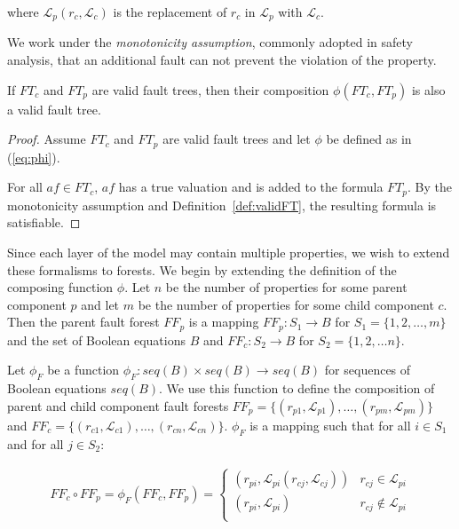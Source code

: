 where $\mathcal{L}_p(r_c, \mathcal{L}_c)$ is the replacement of $r_c$ in $\mathcal{L}_p$ with $\mathcal{L}_c$.

We work under the {\em monotonicity assumption}, commonly adopted in safety analysis, that an additional fault can not prevent the violation of the property. 

\begin{lemma} If $\mathit{FT}_c$ and $\mathit{FT}_p$ are valid fault trees, then their composition $\phi(\mathit{FT}_c, \mathit{FT}_p)$ is also a valid fault tree. 
\begin{proof}
Assume $\mathit{FT}_c$ and $\mathit{FT}_p$ are valid fault trees and let $\phi$ be defined as in (\ref{eq:phi}).  

For all $\mathit{af} \in \mathit{FT}_c$, $\mathit{af}$ has a true valuation and is added to the formula $\mathit{FT}_p$. By the monotonicity assumption and Definition~\ref{def:validFT}, the resulting formula is satisfiable. 
\end{proof}
\label{lemma:validTree}
\end{lemma}

Since each layer of the model may contain multiple properties, we wish to extend these formalisms to forests. We begin by extending the definition of the composing function $\phi$. Let $n$ be the number of properties for some parent component $p$ and let $m$ be the number of properties for some child component $c$. Then the parent fault forest $\mathit{FF}_p$ is a mapping $\mathit{FF}_p : S_1 \rightarrow B$ for $S_1 = \{1,2,\dots,m\}$ and the set of Boolean equations $B$ and $\mathit{FF}_c: S_2 \rightarrow B$ for $S_2 = \{1,2,\dots n\}$. 

Let $\phi_F$ be a function $\phi _F: \mathit{seq(B)} \times \mathit{seq(B)} \rightarrow \mathit{seq(B)}$ for sequences of Boolean equations $\mathit{seq(B)}$. We use this function to define the composition of parent and child component fault forests $\mathit{FF}_p = \{(r_{p1},\mathcal{L}_{p1}), \dots, (r_ {pm}, \mathcal{L}_{pm})\}$ and $\mathit{FF}_c = \{(r_{c1},\mathcal{L}_{c1}), \dots, (r_ {cn}, \mathcal{L}_{cn})\}$. $\phi_F$ is a mapping such that for all $i \in S_1$ and for all $j \in S_2$: 

\begin{gather}
\mathit{FF}_c \circ \mathit{FF}_p = \phi_F(\mathit{FF}_c, \mathit{FF}_p) =\begin{cases} 
      (r_{pi}, \mathcal{L}_{pi}(r_{cj}, \mathcal{L}_{cj})) & r_{cj} \in \mathcal{L}_{pi} \\
      (r_{pi}, \mathcal{L}_{pi}) & r_{cj} \not\in \mathcal{L}_{pi} \\
   \end{cases}
\end{gather}

